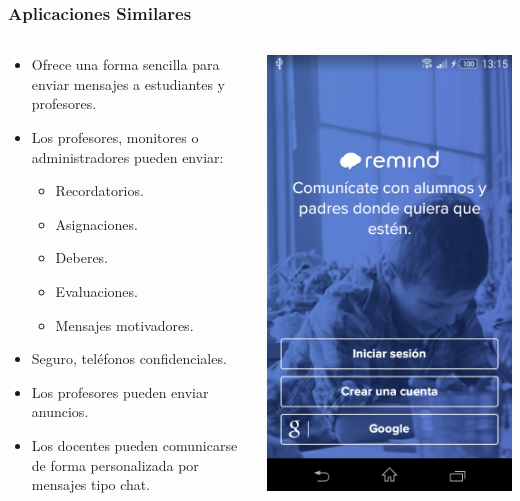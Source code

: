 \begin{frame}
	\frametitle{Aplicaciones Similares}
	\begin{columns}
		\begin{column}{0.6\textwidth}
				\begin{itemize}
					\item Ofrece una forma sencilla para enviar mensajes a estudiantes y profesores.
					\item Los profesores, monitores o administradores pueden enviar:
						\begin{itemize}
							\item Recordatorios.
							\item Asignaciones.
							\item Deberes.
							\item Evaluaciones.
							\item Mensajes motivadores.
						\end{itemize}
					\item Seguro, teléfonos confidenciales.
					\item Los profesores pueden enviar anuncios.
					\item Los docentes pueden comunicarse de forma personalizada por mensajes tipo chat.
				\end{itemize}
			\endblock{}
		\end{column}
		\begin{column}{0.4\textwidth}
			\hfill \includegraphics[width=0.7\linewidth]{Images/Remind.png}
		\end{column}
	\end{columns}
\end{frame}

